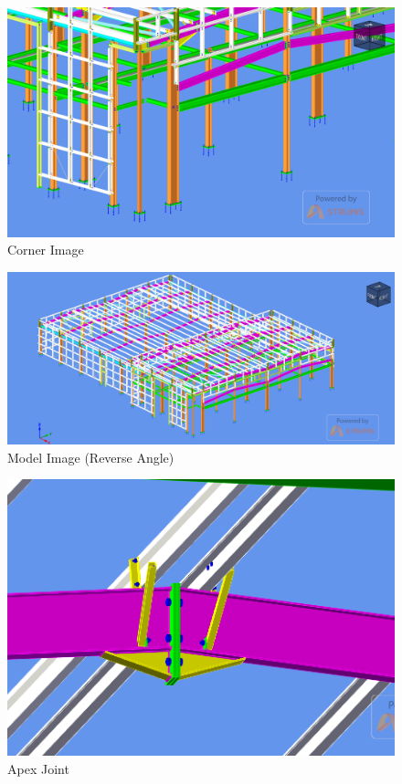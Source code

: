 \begin{figure}
	\centering
	\includegraphics[width=1.0\linewidth]{a3img/7.png}
	\caption{Corner Image}
	\label{fig:ass3img7}
\end{figure}

\begin{figure}
	\centering
	\includegraphics[width=1.0\linewidth]{a3img/8.png}
	\caption{Model Image (Reverse Angle)}
	\label{fig:ass3img8}
\end{figure}

\begin{figure}
	\centering
	\includegraphics[width=1.0\linewidth]{a3img/9.png}
	\caption{Apex Joint}
	\label{fig:ass3img9}
\end{figure}

